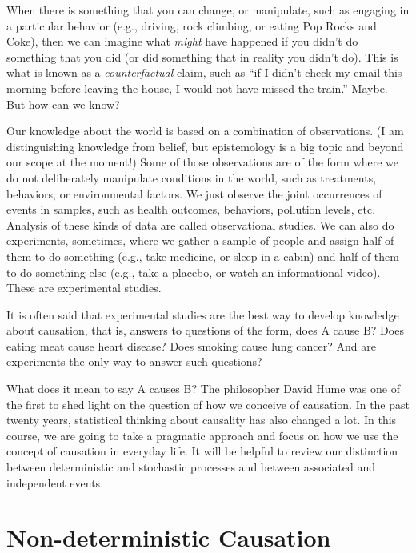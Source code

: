\documentclass[
  openany]{book}
\begin{document}
When there is something that you can change, or manipulate, such as engaging in a particular behavior (e.g., driving, rock climbing, or eating Pop Rocks and Coke), then we can imagine what \emph{might} have happened if you didn't do something that you did (or did something that in reality you didn't do). This is what is known as a \emph{counterfactual} claim, such as ``if I didn't check my email this morning before leaving the house, I would not have missed the train.'' Maybe. But how can we know?

Our knowledge about the world is based on a combination of observations. (I am distinguishing knowledge from belief, but epistemology is a big topic and beyond our scope at the moment!) Some of those observations are of the form where we do not deliberately manipulate conditions in the world, such as treatments, behaviors, or environmental factors. We just observe the joint occurrences of events in samples, such as health outcomes, behaviors, pollution levels, etc. Analysis of these kinds of data are called observational studies. We can also do experiments, sometimes, where we gather a sample of people and assign half of them to do something (e.g., take medicine, or sleep in a cabin) and half of them to do something else (e.g., take a placebo, or watch an informational video). These are experimental studies.

It is often said that experimental studies are the best way to develop knowledge about causation, that is, answers to questions of the form, does A cause B? Does eating meat cause heart disease? Does smoking cause lung cancer? And are experiments the only way to answer such questions?

What does it mean to say A causes B? The philosopher David Hume was one of the first to shed light on the question of how we conceive of causation. In the past twenty years, statistical thinking about causality has also changed a lot. In this course, we are going to take a pragmatic approach and focus on how we use the concept of causation in everyday life. It will be helpful to review our distinction between deterministic and stochastic processes and between associated and independent events.

\hypertarget{non-deterministic-causation}{%
\section*{Non-deterministic Causation}\label{non-deterministic-causation}}
\end{document}
